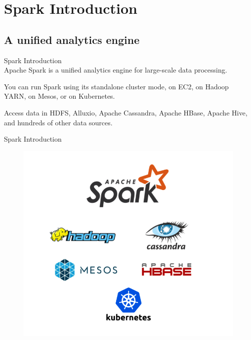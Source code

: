\section{Spark Introduction}
\subsection{A unified analytics engine}
\begin{frame}[plain,t]{Spark Introduction} %
	 \\  \vspace{2ex}
     Apache Spark is a unified analytics engine for large-scale data processing.
     
     \vspace{2ex}
     
     You can run Spark using its standalone cluster mode, on EC2, on Hadoop YARN, on Mesos, or on Kubernetes. 
     
      \vspace{2ex}
      
     Access data in HDFS, Alluxio, Apache Cassandra, Apache HBase, Apache Hive, and hundreds of other data sources.
     
     
    
\end{frame}
\begin{frame}[plain,t]{Spark Introduction} %
	 \\  \vspace{2ex}
	\begin{figure}
		\centering
		\includegraphics[width=0.7\linewidth]{images/intr002}
		\label{fig:intr002}
	\end{figure}
	
\end{frame}
